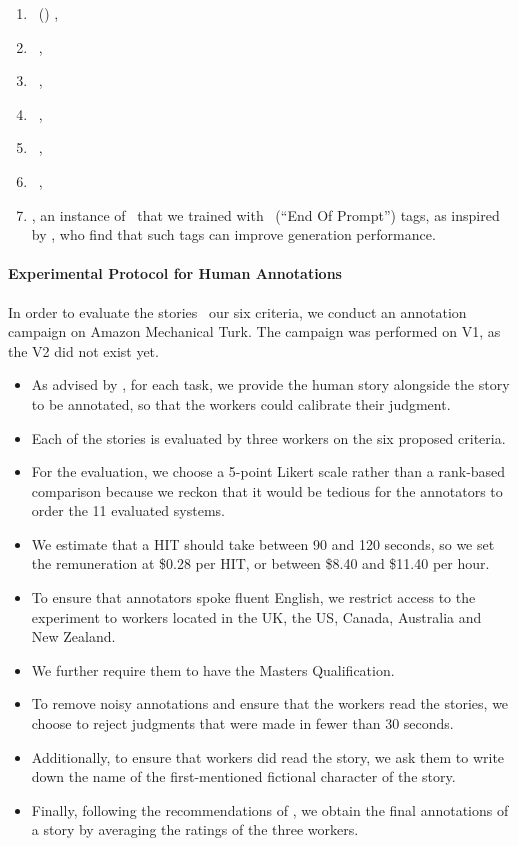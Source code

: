 \begin{enumerate}[noitemsep]
    \item \bertgeneration\ (\bertgen) \citep{rothe2020leveraging},
    \item \ctrl\ \citep{keskar2019ctrl},
    \item \roberta\ \citep{liu2019roberta},
    \item \xlnet\ \citep{yang2019xlnet},
    \item \gpt\ \citep{radford2018improving},
    \item \gptt\ \citep{radford2019language},
    \item \gpttag, an instance of \gptt\ that we trained with \eoptag\ (``End Of Prompt'') tags, as inspired by \citet{bai2021semantics}, who find that such tags can improve generation performance.
\end{enumerate}

\paragraph{Experimental Protocol for Human Annotations}
\label{par:experimental_protocol_human_annotation}

In order to evaluate the {\hanna} stories \wrt\ our six criteria, we conduct an annotation campaign on Amazon Mechanical Turk. The campaign was performed on {\hanna} V1, as the V2 did not exist yet.

\begin{itemize}[noitemsep]
    \item As advised by \citet{karpinska2021perils}, for each task, we provide the human story alongside the story to be annotated, so that the workers could calibrate their judgment.
    \item Each of the stories is evaluated by three workers on the six proposed criteria.
    \item For the evaluation, we choose a 5-point Likert scale rather than a rank-based comparison because we reckon that it would be tedious for the annotators to order the 11 evaluated systems.
    \item We estimate that a HIT should take between 90 and 120 seconds, so we set the remuneration at \$0.28 per HIT, or between \$8.40 and \$11.40 per hour.
    \item To ensure that annotators spoke fluent English, we restrict access to the experiment to workers located in the UK, the US, Canada, Australia and New Zealand.
    \item We further require them to have the Masters Qualification.
    \item To remove noisy annotations and ensure that the workers read the stories, we choose to reject judgments that were made in fewer than 30 seconds.
    \item Additionally, to ensure that workers did read the story, we ask them to write down the name of the first-mentioned fictional character of the story.
    \item Finally, following the recommendations of \citet{shapira-etal-2019-crowdsourcing}, we obtain the final annotations of a story by averaging the ratings of the three workers.
\end{itemize}

